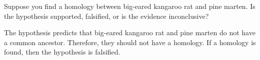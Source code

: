 %
%
%
%
%
%
%
%
%

\question[3]\label{last_phylo}
Suppose you find a homology between big-eared kangaroo rat and pine marten. Is
the hypothesis supported, falsified, or is the evidence inconclusive?
	\begin{solution}
		The hypothesis predicts that big-eared kangaroo rat and pine marten do not have a common ancestor. Therefore, they should not have a homology. If a homology is found, then the hypothesis is falsified.
	\end{solution}

\hidepoints